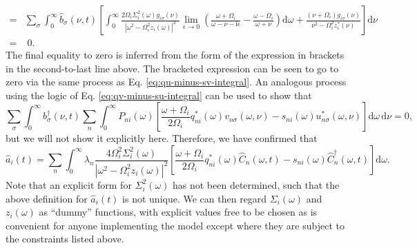 \begin{equation}
\begin{split}
= &\sum_\sigma\int_0^\infty\hat{b}_\sigma(\nu,t)\left[\int_0^\infty\frac{2\Omega_i\Sigma_i^2(\omega)g_{i\sigma}(\nu)}{|\omega^2 - \Omega_i^2z_i(\omega)|^2}\lim_{\epsilon\to0}\left(\frac{\omega + \Omega_i}{\omega - \nu  - \mathrm{i}\epsilon} - \frac{\omega - \Omega_i}{\omega + \nu }\right)\mathrm{d}\omega + \frac{(\nu  + \Omega_i)g_{i\sigma}(\nu)}{\nu ^2 - \Omega_i^2z_i^*(\nu )}\right]\mathrm{d}\nu\\
= &\;0.
\end{split}
\end{equation}
The final equality to zero is inferred from the form of the expression in brackets in the second-to-last line above. The bracketed expression can be seen to go to zero via the same process as Eq. \eqref{eq:qu-minus-sv-integral}. An analogous process using the logic of Eq. \eqref{eq:qv-minus-su-integral} can be used to show that 
\begin{equation}
\sum_\sigma\int_0^\infty b_\sigma^\dagger(\nu,t)\sum_n\int_0^\infty P_{ni}(\omega)\left[\frac{\omega + \Omega_i}{2\Omega_i}q_{ni}^*(\omega)v_{n\sigma}(\omega,\nu) - s_{ni}(\omega)u_{n\sigma}^*(\omega,\nu)\right]\mathrm{d}\omega\,\mathrm{d}\nu = 0,
\end{equation}
but we will not show it explicitly here. Therefore, we have confirmed that
\begin{equation}
\hat{a}_i(t) = \sum_n\int_0^\infty \lambda_n\frac{4\Omega_i^2\Sigma_i^2(\omega)}{|\omega^2 - \Omega_i^2z_i(\omega)|^2}\left[\frac{\omega + \Omega_i}{2\Omega_i}q_{ni}^*(\omega)\hat{C}_n(\omega,t) - s_{ni}(\omega)\hat{C}_n^\dagger(\omega,t)\right]\mathrm{d}\omega.
\end{equation}
Note that an explicit form for $\Sigma_i^2(\omega)$ has not been determined, such that the above definition for $\hat{a}_i(t)$ is not unique. We can then regard $\Sigma_i(\omega)$ and $z_i(\omega)$ as ``dummy'' functions, with explicit values free to be chosen as is convenient for anyone implementing the model except where they are subject to the constraints listed above.

